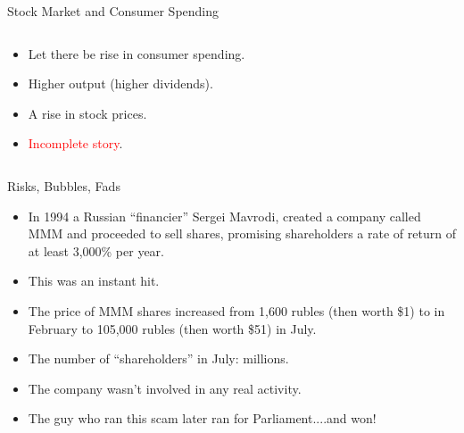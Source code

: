 \documentclass[shownotes,11pt, aspectratio=169]{beamer}
\begin{document}
\begin{frame}{Stock Market and Consumer Spending}
\begin{columns}[T] %
\begin{column}{.36\textwidth}
\begin{itemize}
\item Let there be rise in consumer spending.
\item Higher output (higher dividends).
\item A rise in stock prices.
\pause
\item \textcolor{red}{Incomplete story}. 
\end{itemize}
\end{column}
\hfill
\pause
\begin{column}{.54\textwidth}
\end{column}
\end{columns}
\end{frame}

\begin{frame}{Risks, Bubbles, Fads}
\begin{itemize}
\item In 1994 a Russian ``financier'' Sergei Mavrodi, created a company called MMM and proceeded to sell shares, promising shareholders a rate of return of at least 3,000\% per year.
\item This was an instant hit.
\item  The price of MMM shares increased from 1,600 rubles (then worth \$1) to in February to 105,000 rubles (then worth \$51) in July.
\item The number of ``shareholders'' in July: millions.
\item The company wasn't involved in any real activity. 
\pause
\item The guy who ran this scam later ran for Parliament....\pause and won!
\end{itemize}
\end{frame}
\end{document}
